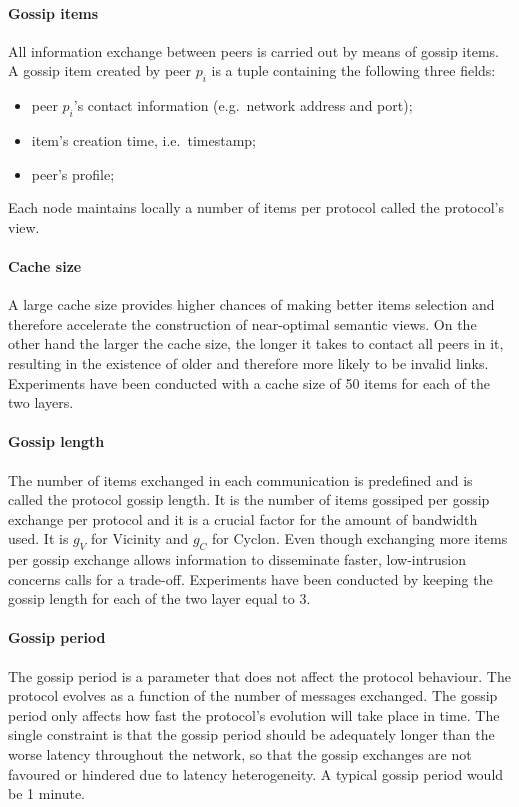 \paragraph{Gossip items} All information exchange between peers is carried out by means of gossip items. A gossip item created by peer $p_i$ is a tuple containing the following three fields:
\begin{itemize}
\item peer $p_i$'s contact information (e.g.\ network address and port);
\item item's creation time, i.e.\ timestamp;
\item peer's profile;
\end{itemize}
Each node maintains locally a number of items per protocol called the protocol's view.

\paragraph{Cache size} A large cache size provides higher chances of making better items selection and therefore accelerate the construction of near-optimal semantic views. On the other hand the larger the cache size, the longer it takes to contact all peers in it, resulting in the existence of older and therefore more likely to be invalid links.  Experiments have been conducted with a cache size of 50 items for each of the two layers.

\paragraph{Gossip length} The number of items exchanged in each communication is predefined and is called the protocol gossip length. It is the number of items gossiped per gossip exchange per protocol and it is a crucial factor for the amount of bandwidth used. It is $g_V$ for Vicinity and $g_C$ for Cyclon. Even though exchanging more items per gossip exchange allows information to disseminate faster, low-intrusion concerns calls for a trade-off. Experiments have been conducted by keeping the gossip length for each of the two layer equal to $3$.

\paragraph{Gossip period} The gossip period is a parameter that does not affect the protocol behaviour. The protocol evolves as a function of the number of messages exchanged. The gossip period only affects how fast the protocol's evolution will take place in time. The single constraint is that the gossip period should be adequately longer than the worse latency throughout the network, so that the gossip exchanges are not favoured or hindered due to latency heterogeneity. A typical gossip period would be 1 minute.

